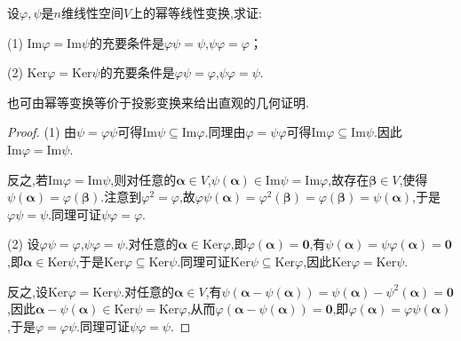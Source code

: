 \documentclass[../../main.tex]{subfiles}%
\begin{document}
\begin{proposition}\label{proposition:幂等变换值域与核空间相等的充要条件1}
设\(\varphi,\psi\)是\(n\)维线性空间\(V\)上的幂等线性变换,求证:

(1) \(\text{Im}\varphi=\text{Im}\psi\)的充要条件是\(\varphi\psi=\psi\),\(\psi\varphi=\varphi\)；

(2) \(\text{Ker}\varphi=\text{Ker}\psi\)的充要条件是\(\varphi\psi=\varphi\),\(\psi\varphi=\psi\).
\end{proposition}
\begin{note}
也可由幂等变换等价于投影变换来给出直观的几何证明.
\end{note}
\begin{proof}

(1) 由\(\psi=\varphi\psi\)可得\(\text{Im}\psi\subseteq\text{Im}\varphi\).同理由\(\varphi=\psi\varphi\)可得\(\text{Im}\varphi\subseteq\text{Im}\psi\).因此\(\text{Im}\varphi=\text{Im}\psi\).

反之,若\(\text{Im}\varphi=\text{Im}\psi\),则对任意的\(\boldsymbol{\alpha}\in V\),\(\psi(\boldsymbol{\alpha})\in\text{Im}\psi=\text{Im}\varphi\),故存在\(\boldsymbol{\beta}\in V\),使得\(\psi(\boldsymbol{\alpha})=\varphi(\boldsymbol{\beta})\).注意到\(\varphi^2=\varphi\),故\(\varphi\psi(\boldsymbol{\alpha})=\varphi^2(\boldsymbol{\beta})=\varphi(\boldsymbol{\beta})=\psi(\boldsymbol{\alpha})\),于是\(\varphi\psi=\psi\).同理可证\(\psi\varphi=\varphi\).

(2) 设\(\varphi\psi=\varphi\),\(\psi\varphi=\psi\).对任意的\(\boldsymbol{\alpha}\in\text{Ker}\varphi\),即\(\varphi(\boldsymbol{\alpha}) = \boldsymbol{0}\),有\(\psi(\boldsymbol{\alpha})=\psi\varphi(\boldsymbol{\alpha}) = \boldsymbol{0}\),即\(\boldsymbol{\alpha}\in\text{Ker}\psi\),于是\(\text{Ker}\varphi\subseteq\text{Ker}\psi\).同理可证\(\text{Ker}\psi\subseteq\text{Ker}\varphi\),因此\(\text{Ker}\varphi=\text{Ker}\psi\).

反之,设\(\text{Ker}\varphi=\text{Ker}\psi\).对任意的\(\boldsymbol{\alpha}\in V\),有\(\psi(\boldsymbol{\alpha}-\psi(\boldsymbol{\alpha}))=\psi(\boldsymbol{\alpha})-\psi^2(\boldsymbol{\alpha}) = \boldsymbol{0}\),因此\(\boldsymbol{\alpha}-\psi(\boldsymbol{\alpha})\in\text{Ker}\psi=\text{Ker}\varphi\),从而\(\varphi(\boldsymbol{\alpha}-\psi(\boldsymbol{\alpha})) = \boldsymbol{0}\),即\(\varphi(\boldsymbol{\alpha})=\varphi\psi(\boldsymbol{\alpha})\),于是\(\varphi=\varphi\psi\).同理可证\(\psi\varphi=\psi\).

\end{proof}
\end{document}
